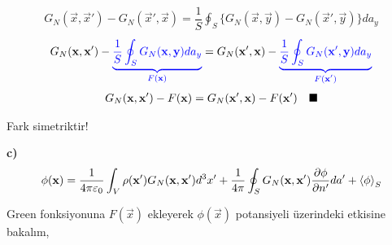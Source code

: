 \begin{align*}
G_{N} (\Vec{x}, \vec{x}') - G_{N} (\vec{x}', \Vec{x} ) =  \dfrac{1}{S} \oint_{S} \bigg\{ G_{N} ( \Vec{x} , \Vec{y})  - G_{N} ( \vec{x}', \Vec{y} ) \bigg\} da_{y} 
\end{align*}
\begin{align*}
G_{N} (\Vec{x}, \vec{x}') - \begingroup \color{blue}{\underbrace{ \dfrac{1}{S} \oint_{S} G_{N} ( \Vec{x} , \Vec{y}) da_{y}}_\text{$F(\Vec{x})$} } \endgroup   =  G_{N} (\vec{x}', \Vec{x} ) -\begingroup \color{blue}{\underbrace{ \dfrac{1}{S} \oint_{S} G_{N} ( \vec{x}' , \Vec{y}) da_{y}}_\text{$F(\vec{x}')$} } \endgroup
\end{align*}
\begin{align*}
G_{N} (\Vec{x}, \vec{x}')  - F (\Vec{x})   =  G_{N} (\vec{x}', \Vec{x} )  - F (\vec{x}') \qed
\end{align*}
\begin{tcolorbox}
\centering
Fark simetriktir!
\end{tcolorbox}

\newpage

\textbf{c)}
\begin{align*}
  \phi ( \Vec{x}) =  \dfrac{1}{4 \pi \epsilon_{0}} \int_{V} \rho ( \vec{x}' )  G_{N}( \Vec{x} ,\vec{x}' ) d^{3} x' + \dfrac{1}{4 \pi} \oint_{S}  G_{N}( \Vec{x} ,\vec{x}' ) \dfrac{\partial \phi}{\partial n'}  da' + \mean{\phi}_{S}
\end{align*}

Green fonksiyonuna $F(\Vec{x})$ ekleyerek $\phi (\Vec{x}) $ potansiyeli üzerindeki etkisine bakalım,

